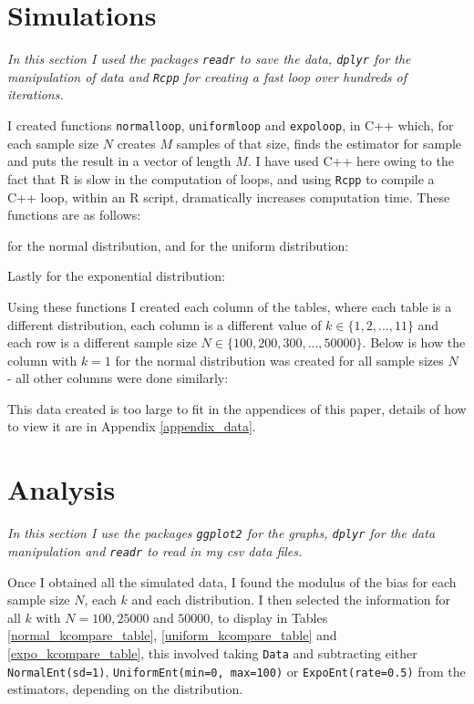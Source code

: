 \documentclass[12pt]{report}
\begin{document}
\begin{appendix}
\section{Simulations}

\textit{In this section I used the packages \texttt{readr} to save the data, \texttt{dplyr} for the manipulation of data and \texttt{Rcpp} for creating a fast loop over hundreds of iterations.} 

I created functions \texttt{normalloop}, \texttt{uniformloop} and \texttt{expoloop}, in C++ which, for each sample size $N$ creates $M$ samples of that size, finds the estimator for sample and puts the result in a vector of length $M$. I have used C++ here owing to the fact that R is slow in the computation of loops, and using \texttt{Rcpp} to compile a C++ loop, within an R script, dramatically increases computation time. These functions are as follows:



for the normal distribution, and for the uniform distribution:



Lastly for the exponential distribution:



Using these functions I created each column of the tables, where each table is a different distribution, each column is a different value of $k \in \{1, 2, ..., 11\}$ and each row is a different sample size $N \in \{100, 200, 300, ..., 50000\}$. Below is how the column with $k=1$ for the normal distribution was created for all sample sizes $N$ - all other columns were done similarly:



This data created is too large to fit in the appendices of this paper, details of how to view it are in Appendix \ref{appendix_data}.


\section{Analysis}

\textit{In this section I use the packages \texttt{ggplot2} for the graphs, \texttt{dplyr} for the data manipulation and \texttt{readr} to read in my csv data files.}

Once I obtained all the simulated data, I found the modulus of the bias for each sample size $N$, each $k$ and each distribution. I then selected the information for all $k$ with $N=100, 25000$ and $50000$, to display in Tables \ref{normal_kcompare_table}, \ref{uniform_kcompare_table} and \ref{expo_kcompare_table}, this involved taking \texttt{Data} and subtracting either \texttt{NormalEnt(sd=1)}, \texttt{UniformEnt(min=0, max=100)} or \texttt{ExpoEnt(rate=0.5)} from the estimators, depending on the distribution.


\end{appendix}
\end{document}
